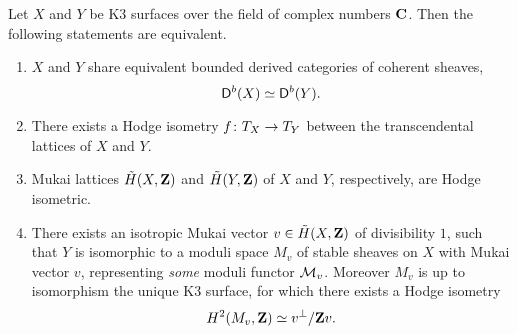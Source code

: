 \begin{theorem}
    \label{Derived torelli at the end}
    Let $X$ and $Y$ be K3 surfaces over the field of complex numbers $\mathbf C$. Then the following statements are equivalent.
    \begin{enumerate}[label = (\roman*)]
        \item{$X$ and $Y$ share equivalent bounded derived categories of coherent sheaves, 
        \[
            \mathsf{D}^b(X) \simeq \mathsf{D}^b(Y).
        \]
        }
        \item{There exists a Hodge isometry $f \colon T_{X} \to T_{Y}$ between the transcendental lattices of $X$ and $Y$.}
        \item{Mukai lattices $\,\tilde{\!{H}}(X, \mathbf Z)$ and $\,\tilde{\!{H}}(Y, \mathbf Z)$ of $X$ and $Y$, respectively, are Hodge isometric. 
        }
        \item{There exists 
        an isotropic Mukai vector $v \in \,\tilde{\!{H}}(X, \mathbf Z)$ of divisibility $1$,
        such that $Y$ is isomorphic to a moduli space $M_v$ of stable sheaves on $X$ with Mukai vector $v$, representing \emph{some} moduli functor $\mathcal M_v$. Moreover $M_v$ is up to isomorphism the unique K3 surface, for which there exists a Hodge isometry
        \[
            H^{2}(M_v, \mathbf Z) \simeq v^\perp / \mathbf Z v.
        \]
        }
    \end{enumerate}
\end{theorem}



